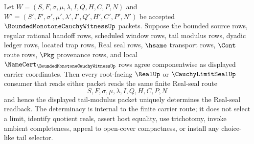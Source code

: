 \begin{theorem}
\label{thm:bounded-monotone-cauchy-witness-real-seal-modulus-determinacy}
Let $W=(S,F,\sigma,\mu,\lambda,I,Q,H,C,P,N)$ and $W'=(S',F',\sigma',\mu',\lambda',I',Q',H',C',P',N')$ be accepted $\BoundedMonotoneCauchyWitnessUp$ packets. Suppose the bounded source rows, regular rational handoff rows, scheduled window rows, tail modulus rows, dyadic ledger rows, located trap rows, Real seal rows, $\hsame$ transport rows, $\Cont$ route rows, $\Pkg$ provenance rows, and local $\NameCert_{\BoundedMonotoneCauchyWitnessUp}$ rows agree componentwise as displayed carrier coordinates. Then every root-facing $\RealUp$ or $\CauchyLimitSealUp$ consumer that reads either packet reads the same finite Real-seal route
$$
S,F,\sigma,\mu,\lambda,I,Q,H,C,P,N
$$
and hence the displayed tail-modulus packet uniquely determines the Real-seal readback. The determinacy is internal to the finite carrier route; it does not select a limit, identify quotient reals, assert host equality, use trichotomy, invoke ambient completeness, appeal to open-cover compactness, or install any choice-like tail selector.
\end{theorem}
